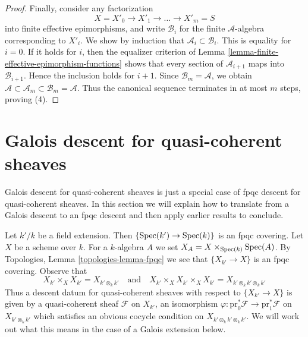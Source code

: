 \begin{proof}
Finally, consider any factorization
$$
X = X'_0 \longrightarrow X'_1 \longrightarrow \ldots
\longrightarrow X'_m = S
$$
into finite effective epimorphisms, and write
$\mathcal{B}_i$ for the finite $\mathcal{A}$-algebra corresponding to
$X'_i$. We show by induction that $\mathcal{A}_i \subset \mathcal{B}_i$.
This is equality for $i = 0$. If it holds for $i$, then the equalizer
criterion of Lemma \ref{lemma-finite-effective-epimorphism-functions}
shows that every section of $\mathcal{A}_{i + 1}$ maps into
$\mathcal{B}_{i + 1}$. Hence the inclusion holds for $i + 1$. Since
$\mathcal{B}_m = \mathcal{A}$, we obtain
$\mathcal{A} \subset \mathcal{A}_m \subset \mathcal{B}_m = \mathcal{A}$.
Thus the canonical sequence terminates in at most $m$ steps, proving (4).
\end{proof}









\section{Galois descent for quasi-coherent sheaves}
\label{section-galois-descent}

\noindent
Galois descent for quasi-coherent sheaves is just a special
case of fpqc descent for quasi-coherent sheaves. In this section
we will explain how to translate from a Galois descent to
an fpqc descent and then apply earlier results to conclude.

\medskip\noindent
Let $k'/k$ be a field extension. Then $\{\mathop{\mathrm{Spec}}(k') \to \mathop{\mathrm{Spec}}(k)\}$
is an fpqc covering. Let $X$ be a scheme over $k$. For a $k$-algebra
$A$ we set $X_A = X \times_{\mathop{\mathrm{Spec}}(k)} \mathop{\mathrm{Spec}}(A)$. By
Topologies, Lemma \ref{topologies-lemma-fpqc}
we see that $\{X_{k'} \to X\}$ is an fpqc covering. Observe that
$$
X_{k'} \times_X X_{k'} = X_{k' \otimes_k k'}
\quad\text{and}\quad
X_{k'} \times_X X_{k'} \times_X X_{k'} = X_{k' \otimes_k k' \otimes_k k'}
$$
Thus a descent datum for quasi-coherent sheaves with respect to
$\{X_{k'} \to X\}$ is given by a quasi-coherent sheaf $\mathcal{F}$
on $X_{k'}$, an isomorphism
$\varphi : \text{pr}_0^*\mathcal{F} \to \text{pr}_1^*\mathcal{F}$
on $X_{k' \otimes_k k'}$
which satisfies an obvious cocycle condition on
$X_{k' \otimes_k k' \otimes_k k'}$.
We will work out what this means in the case of a Galois extension below.

